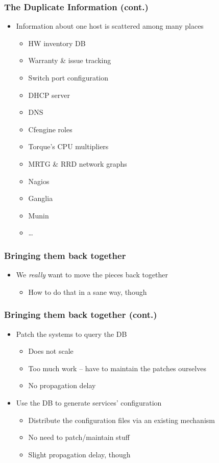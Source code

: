 \documentclass{beamer}
\begin{document}
\begin{frame}[fragile]
\frametitle{The Duplicate Information (cont.)}
\begin{itemize}
    \item Information about one host is scattered among many places
        \begin{itemize}
            \item HW inventory DB
            \item Warranty \& issue tracking
            \item Switch port configuration
            \item DHCP server
            \item DNS
            \item Cfengine roles
            \item Torque's CPU multipliers
            \item MRTG \& RRD network graphs
            \item Nagios
            \item Ganglia
            \item Munin
            \item \ldots
        \end{itemize}
\end{itemize}
\end{frame}

\begin{frame}[fragile]
\frametitle{Bringing them back together}
\begin{itemize}
    \item We {\em really} want to move the pieces back together
        \begin{itemize}
            \item How to do that in a sane way, though
        \end{itemize}
\end{itemize}
\end{frame}

\begin{frame}[fragile]
\frametitle{Bringing them back together (cont.)}
\begin{itemize}
    \item Patch the systems to query the DB
        \begin{itemize}
            \item Does not scale
            \item Too much work -- have to maintain the patches ourselves
            \item No propagation delay
        \end{itemize}
    \item Use the DB to generate services' configuration
        \begin{itemize}
            \item Distribute the configuration files via an existing mechanism
            \item No need to patch/maintain stuff
            \item Slight propagation delay, though
        \end{itemize}
\end{itemize}
\end{frame}
\end{document}
